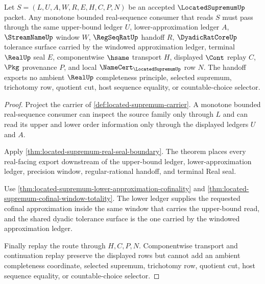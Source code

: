 \begin{theorem}
\label{thm:located-supremum-monotone-sequence-handoff}
Let $S=(L,U,A,W,R,E,H,C,P,N)$ be an accepted $\LocatedSupremumUp$ packet. Any monotone bounded real-sequence consumer that reads $S$ must pass through the same upper-bound ledger $U$, lower-approximation ledger $A$, $\StreamNameUp$ window $W$, $\RegSeqRatUp$ handoff $R$, $\DyadicRatCoreUp$ tolerance surface carried by the windowed approximation ledger, terminal $\RealUp$ seal $E$, componentwise $\hsame$ transport $H$, displayed $\Cont$ replay $C$, $\Pkg$ provenance $P$, and local $\NameCert_{\LocatedSupremumUp}$ row $N$. The handoff exports no ambient $\RealUp$ completeness principle, selected supremum, trichotomy row, quotient cut, host sequence equality, or countable-choice selector.
\end{theorem}
\begin{proof}
Project the carrier of \autoref{def:located-supremum-carrier}. A monotone bounded real-sequence consumer can inspect the source family only through $L$ and can read its upper and lower order information only through the displayed ledgers $U$ and $A$.

Apply \autoref{thm:located-supremum-real-seal-boundary}. The theorem places every real-facing export downstream of the upper-bound ledger, lower-approximation ledger, precision window, regular-rational handoff, and terminal Real seal.

Use \autoref{thm:located-supremum-lower-approximation-cofinality} and \autoref{thm:located-supremum-cofinal-window-totality}. The lower ledger supplies the requested cofinal approximation inside the same window that carries the upper-bound read, and the shared dyadic tolerance surface is the one carried by the windowed approximation ledger.

Finally replay the route through $H,C,P,N$. Componentwise transport and continuation replay preserve the displayed rows but cannot add an ambient completeness coordinate, selected supremum, trichotomy row, quotient cut, host sequence equality, or countable-choice selector.
\end{proof}

